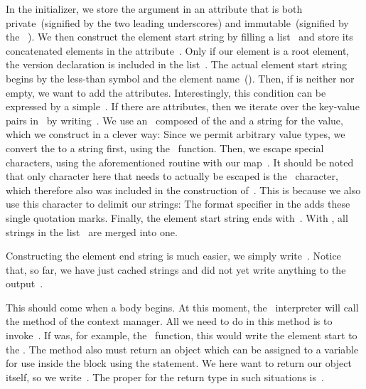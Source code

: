 In the initializer, we store the  argument in an attribute that is both private~(signified by the two leading underscores) and immutable~(signified by the ~).
We then construct the element start string by filling a list~ and store its concatenated elements in the attribute~.
Only if our element is a root element, the  version declaration is included in the list~.
The actual element start string begins by the less-than symbol and the element name~().
Then, if  is neither  nor empty, we want to add the attributes.
Interestingly, this condition can be expressed by a simple~.
If there are attributes, then we iterate over the key-value pairs in~ by writing~.
We use an~ composed of the  and a string for the value, which we construct in a clever way:
Since we permit arbitrary value types, we convert the  to a string first, using the ~function.
Then, we escape special characters, using the aforementioned  routine with our map~.
It should be noted that only character here that needs to actually be escaped is the ~character, which therefore also was included in the construction of~.
This is because we also use this character to delimit our strings:
The  format specifier in the  adds these single quotation marks.
Finally, the element start string ends with~.
With , all strings in the list~ are merged into one.%
%
\begin{sloppypar}%
Constructing the element end string is much easier, we simply write~.
Notice that, so far, we have just cached strings and did not yet write anything to the output~.%
\end{sloppypar}%
%
\begin{sloppypar}%
This should come when a  body begins.
At this moment, the \python~interpreter will call the method  of the context manager.
All we need to do in this method is to invoke~.
If  was, for example, the ~function, this would write the element start to the .
The method  also must return an object which can be assigned to a variable for use inside the  block using the  statement.
We here want to return our  object itself, so we write~.
The proper  for the return type in such situations is~.%
\end{sloppypar}%

